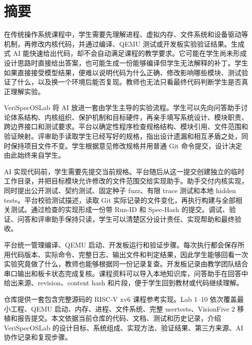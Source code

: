 \chapter*{摘\quad 要}

在传统操作系统课程中，学生需要先理解进程、虚拟内存、文件系统和设备驱动等机制，再修改内核代码，并通过编译、QEMU 测试或开发板实验验证结果。生成式 AI 能快速给出代码，却不会自动满足课程的教学要求。它可能在学生尚未形成设计思路时直接给出答案，也可能生成一份能够编译但学生无法解释的补丁。学生如果直接接受模型结果，便难以说明代码为什么正确、修改影响哪些模块、测试验证了什么，以及换一个环境后能否复现。教师也无法只看最终代码判断学生是否真正理解实验。

VeriSpecOSLab 将 AI 放进一套由学生主导的实验流程。学生可以先向问答助手讨论体系结构、内核组织、保护机制和目标硬件，再亲手填写系统设计、模块职责、跨边界接口和测试要求。平台以确定性程序检查规格结构、模块引用、文件范围和验证映射。评审助手读取学生已经写好的规格，指出设计遗漏和相互矛盾之处，同时保持项目文件不变。学生根据意见修改规格并用普通 Git 命令提交，设计决定由此始终来自学生。

AI 实现代码前，学生需要先提交当前规格。平台随后从这一提交创建独立的临时工作目录，并把目标模块允许修改的文件范围交给实现助手。助手交付内核实现，同时提出公开测试、契约测试、固定种子 fuzz、有限 trace 测试和本地 hidden tests。平台校验测试描述，读取 Git 实际记录的文件变化，再执行构建与全部相关测试。通过检查的实现形成一份带 Run-ID 和 Spec-Hash 的提交。调试、验证、问答和评审助手保持只读，学生可以清楚区分设计责任、实现帮助和最终验收。

平台统一管理编译、QEMU 启动、开发板运行和验证步骤。每次执行都会保存所用代码版本、实际命令、完整日志、输出文件和判定结果，因此学生能够回看一次实验究竟做了什么，教师也能够根据同一份记录复查。开发板记录由教学团队结合串口输出和板卡状态完成复核。课程资料可以导入本地知识库，问答助手在回答中给出来源、revision、content hash 和片段，便于学生回到教材或代码继续理解。

仓库提供一套包含完整源码的 RISC-V xv6 课程参考实现。Lab 1--10 依次覆盖最小工程、QEMU 启动、内存、进程、文件系统、完整 usertests、VisionFive 2 移植和报告提交。本文依据当前仓库的代码、文档、测试和历史记录，介绍 VeriSpecOSLab 的设计目标、系统组成、实现方法、验证结果、第三方来源、AI 协作记录和复现步骤。

\clearpage
